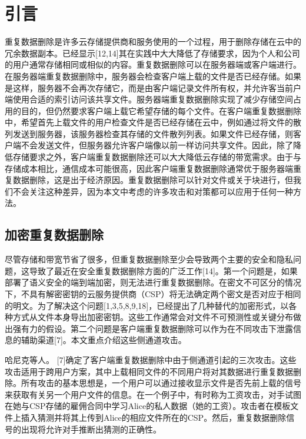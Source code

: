 \section{引言}

重复数据删除是许多云存储提供商和服务使用的一个过程，用于删除存储在云中的冗余数据副本。已经显示[12,14]其在实践中大大降低了存储要求，因为个人和公司的用户通常存储相同或相似的内容。重复数据删除可以在服务器端或客户端进行。在服务器端重复数据删除中，服务器会检查客户端上载的文件是否已经存储。如果是这样，服务器不会再次存储它，而是由客户端记录文件所有权，并允许客当前户端使用合适的索引访问该共享文件。服务器端重复数据删除实现了减少存储空间占用的目的，但仍然要求客户端上载它希望存储的每个文件。在客户端重复数据删除中，希望首先上载文件的用户检查文件是否已经存储在云中，例如通过将文件的散列发送到服务器，该服务器检查其存储的文件散列列表。如果文件已经存储，则客户端不会发送文件，但服务器允许客户端像以前一样访问共享文件。因此，除了降低存储要求之外，客户端重复数据删除还可以大大降低云存储的带宽需求。由于与存储成本相比，通信成本可能很高，因此客户端重复数据删除通常优于服务器端重复数据删除，这是出于经济原因。重复数据删除可以针对文件或关于块进行，但我们不会关注这种差异，因为本文中考虑的许多攻击和对策都可以应用于任何一种方法。

\subsection{加密重复数据删除}

尽管存储和带宽节省了很多，但重复数据删除至少会导致两个主要的安全和隐私问题，这导致了最近在安全重复数据删除方面的广泛工作[14]。第一个问题是，如果部署了语义安全的端到端加密，则无法进行重复数据删除。在密文不可区分的情况下，不具有解密密钥的云服务提供商（CSP）将无法确定两个密文是否对应于相同的明文。为了解决这个问题[1,3,5,8,9,18]，已经提出了几种替代的加密形式，以各种方式从文件本身导出加密密钥。这些工作通常会对文件不可预测性或关键分布做出强有力的假设。第二个问题是客户端重复数据删除可以作为在不同攻击下泄露信息的辅助渠道[7]。本文重点介绍这些侧通道攻击。

哈尼克等人。 [7]确定了客户端重复数据删除中由于侧通道引起的三次攻击。这些攻击适用于跨用户方案，其中上载相同文件的不同用户将对其数据进行重复数据删除。所有攻击的基本思想是，一个用户可以通过接收显示文件是否先前上载的信号来获取有关另一个用户文件的信息。在一个例子中，有时称为工资攻击，对手试图在她与CSP存储的雇佣合同中学习Alice的私人数据（她的工资）。攻击者在模板文件上插入猜测并将其上传到Alice的相应文件所在的CSP。然后，重复数据删除信号的出现将允许对手推断出猜测的正确性。

